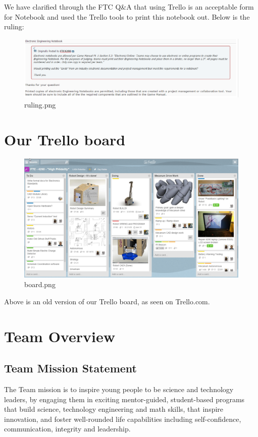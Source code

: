 We have clarified through the FTC Q\&A that using Trello is an acceptable form for Notebook and used the Trello tools to print this notebook out. Below is the ruling:\\

\newpage

\begin{figure}
	\color{darkgray}
	\centering
	\includegraphics[width=\linewidth]{ruling}
	\caption[]{ruling.png}
	\label{fig:ruling}
\end{figure}

\clearpage
\newpage

\section{Our Trello board}
\begin{figure}
	\color{darkgray}
	\centering
	\includegraphics[width=\linewidth]{board}
	\caption[]{board.png}
	\label{fig:board}
\end{figure}
Above is an old version of our Trello board, as seen on Trello.com.
\clearpage
\newpage

\section{Team Overview}
\subsection{Team Mission Statement}
The Team mission is to inspire young people to be science and technology leaders, by engaging them in exciting mentor-guided, student-based programs that build science, technology engineering and math skills, that inspire innovation, and foster well-rounded life capabilities including self-confidence, communication, integrity and leadership.

